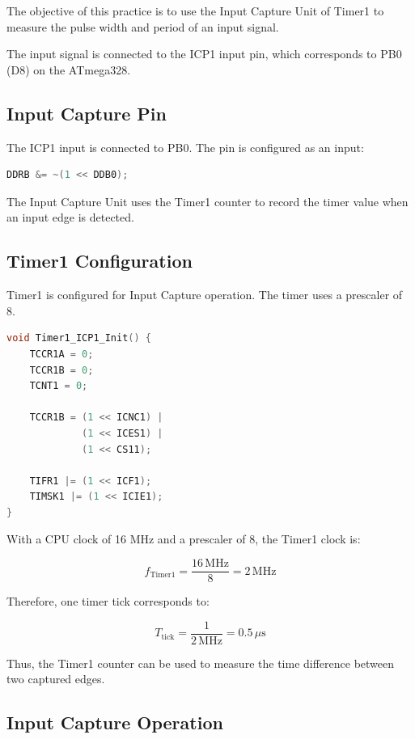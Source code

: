 \documentclass[12pt,a4paper]{article}
\begin{document}
The objective of this practice is to use the Input Capture Unit of
Timer1 to measure the pulse width and period of an input signal.

The input signal is connected to the ICP1 input pin, which corresponds
to PB0 (D8) on the ATmega328.

\subsection{Input Capture Pin}

The ICP1 input is connected to PB0. The pin is configured as an input:

\begin{lstlisting}[language=C]
DDRB &= ~(1 << DDB0);
\end{lstlisting}

The Input Capture Unit uses the Timer1 counter to record the timer
value when an input edge is detected.

\subsection{Timer1 Configuration}

Timer1 is configured for Input Capture operation. The timer uses a
prescaler of 8.

\begin{lstlisting}[language=C]
void Timer1_ICP1_Init() {
    TCCR1A = 0;
    TCCR1B = 0;
    TCNT1 = 0;

    TCCR1B = (1 << ICNC1) |
             (1 << ICES1) |
             (1 << CS11);

    TIFR1 |= (1 << ICF1);
    TIMSK1 |= (1 << ICIE1);
}
\end{lstlisting}

With a CPU clock of 16 MHz and a prescaler of 8, the Timer1 clock is:

\[
f_{\mathrm{Timer1}}
=
\frac{16\,\mathrm{MHz}}{8}
=
2\,\mathrm{MHz}
\]

Therefore, one timer tick corresponds to:

\[
T_{\mathrm{tick}}
=
\frac{1}{2\,\mathrm{MHz}}
=
0.5\,\mu\mathrm{s}
\]

Thus, the Timer1 counter can be used to measure the time difference
between two captured edges.

\subsection{Input Capture Operation}
\end{document}
